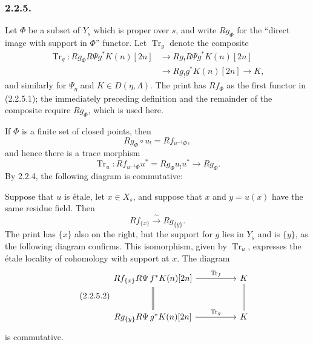 \subsubsection*{2.2.5.}
Let $\Phi$ be a subset of $Y_s$ which is proper over $s$, and write
$Rg_\Phi$ for the ``direct image with support in $\Phi$'' functor.
Let $\operatorname{Tr}_g$ denote the composite
\begin{equation}\tag{2.2.5.1}
\begin{split}
\operatorname{Tr}_g:
Rg_\Phi R\Psi g^*K(n)[2n]
&\longrightarrow Rg_!R\Psi g^*K(n)[2n] \\
&\longrightarrow Rg_!g^*K(n)[2n]
\longrightarrow K,
\end{split}
\end{equation}
and similarly for $\Psi_\eta$ and $K\in D(\eta,\Lambda)$.  The print
has $Rf_\Phi$ as the first functor in (2.2.5.1); the immediately
preceding definition and the remainder of the composite require
$Rg_\Phi$, which is used here.

If $\Phi$ is a finite set of closed points, then
\[
Rg_\Phi\circ u_!=Rf_{u^{-1}\Phi},
\]
and hence there is a trace morphism
\[
\operatorname{Tr}_u:
Rf_{u^{-1}\Phi}u^*=Rg_\Phi u_!u^*\longrightarrow Rg_\Phi.
\]
By 2.2.4, the following diagram is commutative:
\begin{center}
\end{center}

Suppose that $u$ is \'{e}tale, let $x\in X_s$, and suppose that $x$
and $y=u(x)$ have the same residue field.  Then
\[
Rf_{\{x\}}\xrightarrow{\ \sim\ }Rg_{\{y\}}.
\]
The print has $\{x\}$ also on the right, but the support for $g$ lies
in $Y_s$ and is $\{y\}$, as the following diagram confirms.  This
isomorphism, given by $\operatorname{Tr}_u$, expresses the \'{e}tale
locality of cohomology with support at $x$.  The diagram
\begin{equation}\tag{2.2.5.2}
\begin{tikzcd}[column sep=huge, row sep=large]
Rf_{\{x\}}R\Psi\,f^*K(n)[2n]
  \arrow[r, "\operatorname{Tr}_f"] \arrow[d, equal]
  & K \arrow[d, equal] \\
Rg_{\{y\}}R\Psi\,g^*K(n)[2n]
  \arrow[r, "\operatorname{Tr}_g"]
  & K
\end{tikzcd}
\end{equation}
is commutative.

